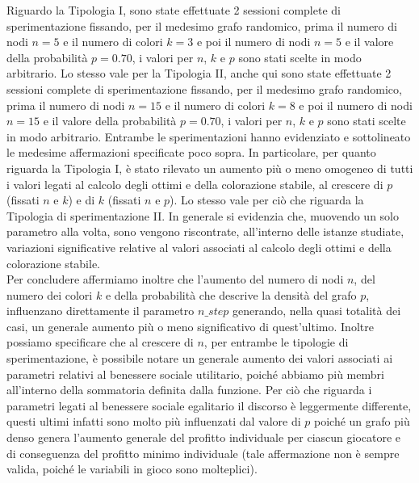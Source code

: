 Riguardo la Tipologia I, sono state effettuate 2 sessioni complete di sperimentazione fissando, per il medesimo grafo randomico, prima il numero di nodi $n=5$ e il numero di colori $k=3$ e poi il numero di nodi $n=5$ e il valore della probabilità $p=0.70$, i valori per $n$, $k$ e $p$ sono stati scelte in modo arbitrario. Lo stesso vale per la Tipologia II, anche qui sono state effettuate 2 sessioni complete di sperimentazione fissando, per il medesimo grafo randomico, prima il numero di nodi $n=15$ e il numero di colori $k=8$ e poi il numero di nodi $n=15$ e il valore della probabilità $p=0.70$, i valori per $n$, $k$ e $p$ sono stati scelte in modo arbitrario. Entrambe le sperimentazioni hanno evidenziato e sottolineato le medesime affermazioni specificate poco sopra. In particolare, per quanto riguarda la Tipologia I, è stato rilevato un aumento più o meno omogeneo di tutti i valori legati al calcolo degli ottimi e della colorazione stabile, al crescere di $p$ (fissati $n$ e $k$) e di $k$ (fissati $n$ e $p$). Lo stesso vale per ciò che riguarda la Tipologia di sperimentazione II. In generale si evidenzia che, muovendo un solo parametro alla volta, sono vengono riscontrate, all'interno delle istanze studiate, variazioni significative relative al valori associati al calcolo degli ottimi e della colorazione stabile.\\
Per concludere affermiamo inoltre che l'aumento del numero di nodi $n$, del numero dei colori $k$ e della probabilità che descrive la densità del grafo $p$, influenzano direttamente il parametro $n\_step$ generando, nella quasi totalità dei casi, un generale aumento più o meno significativo di quest'ultimo. Inoltre possiamo specificare che al crescere di $n$, per entrambe le tipologie di sperimentazione, è possibile notare un generale aumento dei valori associati ai parametri relativi al benessere sociale utilitario, poiché abbiamo più membri all'interno della sommatoria definita dalla funzione. Per ciò che riguarda i parametri legati al benessere sociale egalitario il discorso è leggermente differente, questi ultimi infatti sono molto più influenzati dal valore di $p$ poiché un grafo più denso genera l'aumento generale del profitto individuale per ciascun giocatore e di conseguenza del profitto minimo individuale (tale affermazione non è sempre valida, poiché le variabili in gioco sono molteplici).\\ 

